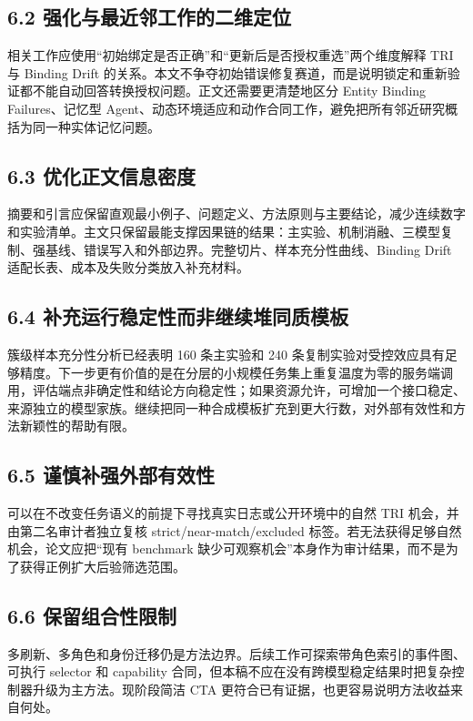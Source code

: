 \documentclass[10.5pt,fontset=none]{ctexart}
\begin{document}
\subsection{6.2 强化与最近邻工作的二维定位}
\par 相关工作应使用“初始绑定是否正确”和“更新后是否授权重选”两个维度解释 TRI 与 Binding Drift 的关系。本文不争夺初始错误修复赛道，而是说明锁定和重新验证都不能自动回答转换授权问题。正文还需要更清楚地区分 Entity Binding Failures、记忆型 Agent、动态环境适应和动作合同工作，避免把所有邻近研究概括为同一种实体记忆问题。
\subsection{6.3 优化正文信息密度}
\par 摘要和引言应保留直观最小例子、问题定义、方法原则与主要结论，减少连续数字和实验清单。主文只保留最能支撑因果链的结果：主实验、机制消融、三模型复制、强基线、错误写入和外部边界。完整切片、样本充分性曲线、Binding Drift 适配长表、成本及失败分类放入补充材料。
\subsection{6.4 补充运行稳定性而非继续堆同质模板}
\par 簇级样本充分性分析已经表明 160 条主实验和 240 条复制实验对受控效应具有足够精度。下一步更有价值的是在分层的小规模任务集上重复温度为零的服务端调用，评估端点非确定性和结论方向稳定性；如果资源允许，可增加一个接口稳定、来源独立的模型家族。继续把同一种合成模板扩充到更大行数，对外部有效性和方法新颖性的帮助有限。
\subsection{6.5 谨慎补强外部有效性}
\par 可以在不改变任务语义的前提下寻找真实日志或公开环境中的自然 TRI 机会，并由第二名审计者独立复核 strict/near-match/excluded 标签。若无法获得足够自然机会，论文应把“现有 benchmark 缺少可观察机会”本身作为审计结果，而不是为了获得正例扩大后验筛选范围。
\subsection{6.6 保留组合性限制}
\par 多刷新、多角色和身份迁移仍是方法边界。后续工作可探索带角色索引的事件图、可执行 selector 和 capability 合同，但本稿不应在没有跨模型稳定结果时把复杂控制器升级为主方法。现阶段简洁 CTA 更符合已有证据，也更容易说明方法收益来自何处。
\end{document}
